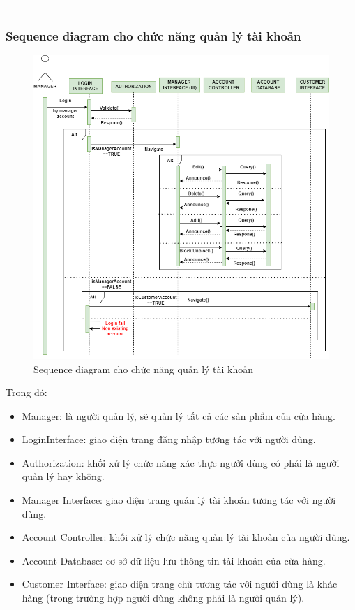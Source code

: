 \begin {list} {-}{}
\subsubsection{Sequence diagram cho chức năng quản lý tài khoản}
\begin{figure}[H]
    \centering
    \includegraphics[scale=0.5]{images/hieu/chap-3/manage-account-sequence-diagram.png}
    \caption{Sequence diagram cho chức năng quản lý tài khoản}
\end{figure}
Trong đó:
\begin{itemize}
    \item Manager: là người quản lý, sẽ quản lý tất cả các sản phẩm của cửa hàng.
    \item LoginInterface: giao diện trang đăng nhập tương tác với người dùng.
    \item Authorization: khối xử lý chức năng xác thực người dùng có phải là người quản lý hay không.
    \item Manager Interface: giao diện trang quản lý tài khoản tương tác với người dùng.
    \item Account Controller: khối xử lý chức năng quản lý tài khoản của người dùng.
    \item Account Database: cơ sở dữ liệu lưu thông tin tài khoản của cửa hàng.
    \item Customer Interface: giao diện trang chủ tương tác với người dùng là khác hàng (trong trường hợp người dùng không phải là người quản lý).
\end{itemize}
\newpage

\end{list}
